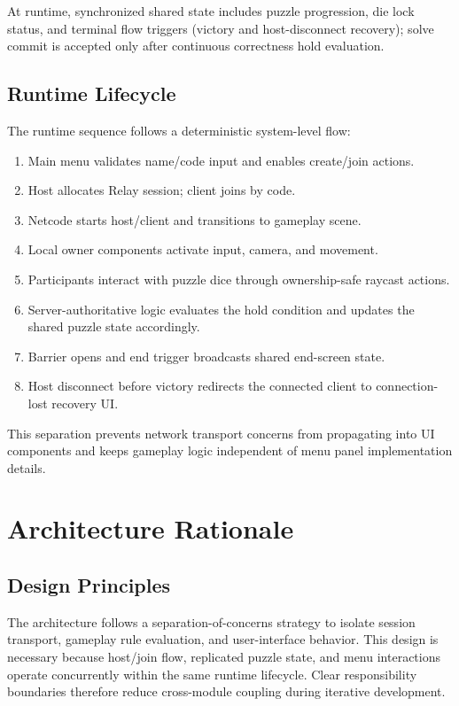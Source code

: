 At runtime, synchronized shared state includes puzzle progression, die lock status, and terminal flow triggers (victory and host-disconnect recovery); solve commit is accepted only after continuous correctness hold evaluation.

\subsection*{Runtime Lifecycle}
The runtime sequence follows a deterministic system-level flow:
\begin{enumerate}
\item Main menu validates name/code input and enables create/join actions.
\item Host allocates Relay session; client joins by code.
\item Netcode starts host/client and transitions to gameplay scene.
\item Local owner components activate input, camera, and movement.
\item Participants interact with puzzle dice through ownership-safe raycast actions.
\item Server-authoritative logic evaluates the hold condition and updates the shared puzzle state accordingly.
\item Barrier opens and end trigger broadcasts shared end-screen state.
\item Host disconnect before victory redirects the connected client to connection-lost recovery UI.
\end{enumerate}

This separation prevents network transport concerns from propagating into UI components and keeps gameplay logic independent of menu panel implementation details.

\section{Architecture Rationale}
\subsection*{Design Principles}
The architecture follows a separation-of-concerns strategy to isolate session transport, gameplay rule evaluation, and user-interface behavior. This design is necessary because host/join flow, replicated puzzle state, and menu interactions operate concurrently within the same runtime lifecycle. Clear responsibility boundaries therefore reduce cross-module coupling during iterative development.

